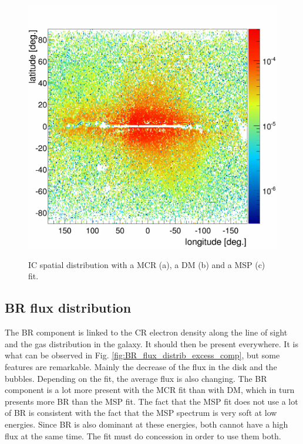 \begin{figure}[h]
\begin{minipage}[h]{0.45\textwidth}
	  \label{}
  \end{minipage}
  \hfill
  \begin{minipage}[h]{0.45\textwidth}
	  \centering
	  \includegraphics[width=1.\linewidth]{pic/discussion/MSPonly_fine_IC_integral_distribution.png}
	  \label{}
  \end{minipage}
  \caption[IC spatial distributions.]{IC spatial distribution with a MCR (a), a DM (b) and a MSP (c) fit.}
  \label{fig:IC_flux_distrib_excess_comp}	 
\end{figure}

\newpage
\subsection{BR flux distribution}
The BR component is linked to the CR electron density along the line of sight and the gas distribution in the galaxy. It should then be present everywhere. It is what can be observed in Fig. \ref{fig:BR_flux_distrib_excess_comp}, but some features are remarkable. Mainly the decrease of the flux in the disk and the bubbles.
Depending on the fit, the average flux is also changing. The BR component is a lot more present with the MCR fit than with DM, which in turn presents more BR than the MSP fit. The fact that the MSP fit does not use a lot of BR is consistent with the fact that the MSP spectrum is very soft at low energies. Since BR is also dominant at these energies, both cannot have a high flux at the same time. The fit must do concession in order to use them both.


